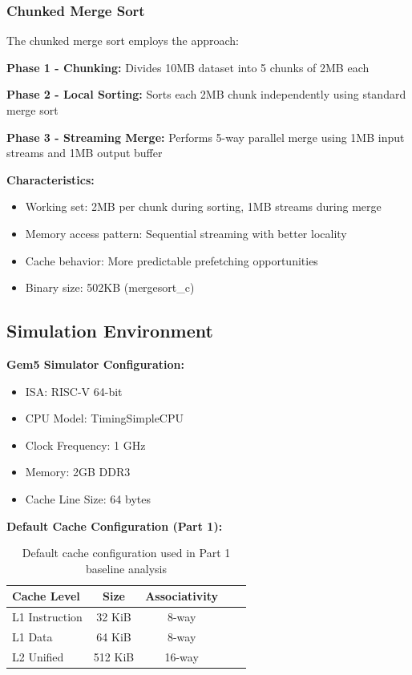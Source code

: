 \documentclass[12pt,a4paper]{article}
\begin{document}
\subsubsection{Chunked Merge Sort}

The chunked merge sort employs the approach:

\textbf{Phase 1 - Chunking:} Divides 10MB dataset into 5 chunks of 2MB each

\textbf{Phase 2 - Local Sorting:} Sorts each 2MB chunk independently using standard merge sort

\textbf{Phase 3 - Streaming Merge:} Performs 5-way parallel merge using 1MB input streams and 1MB output buffer

\textbf{Characteristics:}
\begin{itemize}
    \item Working set: 2MB per chunk during sorting, 1MB streams during merge
    \item Memory access pattern: Sequential streaming with better locality
    \item Cache behavior: More predictable prefetching opportunities
    \item Binary size: 502KB (mergesort\_c)
\end{itemize}

\subsection{Simulation Environment}

\textbf{Gem5 Simulator Configuration:}
\begin{itemize}
    \item ISA: RISC-V 64-bit 
    \item CPU Model: TimingSimpleCPU
    \item Clock Frequency: 1 GHz
    \item Memory: 2GB DDR3
    \item Cache Line Size: 64 bytes
\end{itemize}

\textbf{Default Cache Configuration (Part 1):}
\begin{table}[H]
\centering
\begin{tabular}{lcccc}
\toprule
\textbf{Cache Level} & \textbf{Size} & \textbf{Associativity} \\
\midrule
L1 Instruction & 32 KiB & 8-way  \\
L1 Data & 64 KiB & 8-way & \\
L2 Unified & 512 KiB & 16-way  \\
\bottomrule
\end{tabular}
\caption{Default cache configuration used in Part 1 baseline analysis}
\label{tab:default_config}
\end{table}
\end{document}
